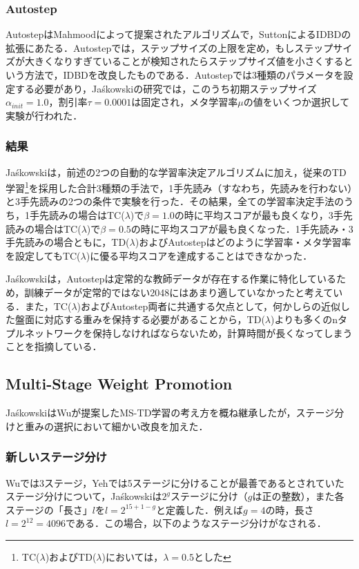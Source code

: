 \documentclass{suribt}
\begin{document}
\subsubsection{Autostep}
AutostepはMahmoodによって提案されたアルゴリズムで，SuttonによるIDBDの拡張にあたる．Autostepでは，ステップサイズの上限を定め，もしステップサイズが大きくなりすぎていることが検知されたらステップサイズ値を小さくするという方法で，IDBDを改良したものである．Autostepでは3種類のパラメータを設定する必要があり，Ja\'{s}kowskiの研究では，このうち初期ステップサイズ${\alpha}_{init} = 1.0$，割引率${\tau} = 0.0001$は固定され，メタ学習率${\mu}$の値をいくつか選択して実験が行われた．

\subsubsection{結果}
Ja\'{s}kowskiは，前述の2つの自動的な学習率決定アルゴリズムに加え，従来のTD学習\footnote{TC(${\lambda}$)およびTD(${\lambda}$)においては，${\lambda}=0.5$とした}を採用した合計3種類の手法で，1手先読み（すなわち，先読みを行わない）と3手先読みの2つの条件で実験を行った．その結果，全ての学習率決定手法のうち，1手先読みの場合はTC(${\lambda}$)で${\beta}=1.0$の時に平均スコアが最も良くなり，3手先読みの場合はTC(${\lambda}$)で${\beta}=0.5$の時に平均スコアが最も良くなった．1手先読み・3手先読みの場合ともに，TD(${\lambda}$)およびAutostepはどのように学習率・メタ学習率を設定してもTC(${\lambda}$)に優る平均スコアを達成することはできなかった．

Ja\'{s}kowskiは，Autostepは定常的な教師データが存在する作業に特化しているため，訓練データが定常的ではない2048にはあまり適していなかったと考えている．また，TC(${\lambda}$)およびAutostep両者に共通する欠点として，何かしらの近似した盤面に対応する重みを保持する必要があることから，TD(${\lambda}$)よりも多くのnタプルネットワークを保持しなければならないため，計算時間が長くなってしまうことを指摘している．

\subsection{Multi-Stage Weight Promotion}
Ja\'{s}kowskiはWuが提案したMS-TD学習の考え方を概ね継承したが，ステージ分けと重みの選択において細かい改良を加えた．

\subsubsection{新しいステージ分け}
Wuでは3ステージ，Yehでは5ステージに分けることが最善であるとされていたステージ分けについて，Ja\'{s}kowskiは$2^g$ステージに分け（$g$は正の整数），また各ステージの「長さ」$l$を$l = 2^{15+1-g}$と定義した．例えば$g=4$の時，長さ$l=2^{12}=4096$である．この場合，以下のようなステージ分けがなされる．
\end{document}

